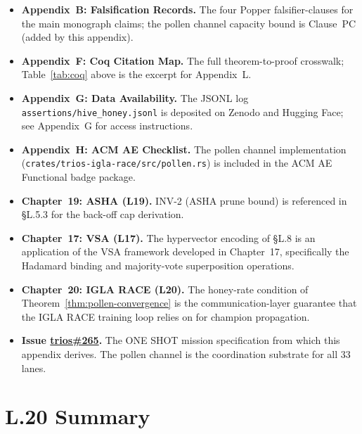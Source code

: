 \begin{itemize}
\item \textbf{Appendix~B: Falsification Records.}  The four Popper
  falsifier-clauses for the main monograph claims; the pollen channel
  capacity bound is Clause~PC (added by this appendix).

\item \textbf{Appendix~F: Coq Citation Map.}  The full theorem-to-proof
  crosswalk; Table~\ref{tab:coq} above is the excerpt for Appendix~L.

\item \textbf{Appendix~G: Data Availability.}  The JSONL log
  \texttt{assertions/hive\_honey.jsonl} is deposited on Zenodo and
  Hugging Face; see Appendix~G for access instructions.

\item \textbf{Appendix~H: ACM AE Checklist.}  The pollen channel
  implementation (\texttt{crates/trios-igla-race/src/pollen.rs})
  is included in the ACM AE Functional badge package.

\item \textbf{Chapter~19: ASHA (L19).}  INV-2 (ASHA prune bound)
  is referenced in §L.5.3 for the back-off cap derivation.

\item \textbf{Chapter~17: VSA (L17).}  The hypervector encoding
  of §L.8 is an application of the VSA framework developed in
  Chapter~17, specifically the Hadamard binding and majority-vote
  superposition operations.

\item \textbf{Chapter~20: IGLA RACE (L20).}  The honey-rate
  condition of Theorem~\ref{thm:pollen-convergence} is the
  communication-layer guarantee that the IGLA RACE training loop
  relies on for champion propagation.

\item \textbf{Issue \href{https://github.com/gHashTag/trios/issues/265}{trios\#265}.}
  The ONE SHOT mission specification from which this appendix derives.
  The pollen channel is the coordination substrate for all 33 lanes.
\end{itemize}

\section*{L.20 \quad Summary}
\label{sec:appl-summary}

